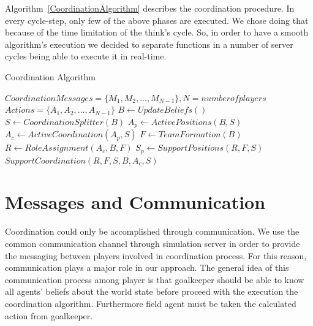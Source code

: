 Algorithm~\ref{CoordinationAlgorithm} describes the coordination procedure. In every cycle-step, only few of the above phases are executed. We chose doing that because of the time limitation of the think's cycle. So, in order to have a smooth algorithm's execution we decided to separate functions in a number of server cycles being able to execute it in real-time.

\begin{algorithm}[ht!]
\caption{Coordination Algorithm }
\label{CoordinationAlgorithm}
\begin{algorithmic}[1]
$Coordination Messages = \lbrace M_{1},M_{2},...,M_{N-1} \rbrace, N = number of players $
$Actions = \lbrace A_{1},A_{2},...,A_{N-1} \rbrace$
\STATE $B \leftarrow Update Beliefs() $
\STATE $S \leftarrow Coordination Splitter(B) $
\STATE $A_{p} \leftarrow Active Positions(B,S) $
\STATE $A_{c} \leftarrow Active Coordination(A_{p},S) $
\STATE $ F \leftarrow TeamFormation(B) $
\STATE $ R \leftarrow Role Assignment(A_{c},B,F) $
\STATE $ S_{p} \leftarrow Support Positions(R,F,S) $
\STATE $ Support Coordination(R,F,S,B,A_{c},S) $
\ENDIF
\end{algorithmic}
\end{algorithm}


\section{Messages and Communication}
Coordination could only be accomplished through communication. We use the common communication channel through simulation server in order to provide the messaging between players involved in coordination process. For this reason, communication plays a major role in our approach. The general idea of this communication process among player is that goalkeeper should be able to know all agents' beliefs about the world state before proceed with the execution the coordination algorithm. Furthermore field agent must be taken the calculated action from goalkeeper. 

